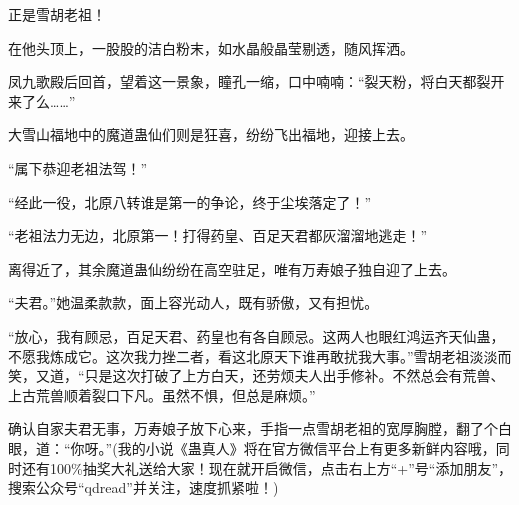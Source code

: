 \begin{this_body}
正是雪胡老祖！

在他头顶上，一股股的洁白粉末，如水晶般晶莹剔透，随风挥洒。

凤九歌殿后回首，望着这一景象，瞳孔一缩，口中喃喃：“裂天粉，将白天都裂开来了么……”

大雪山福地中的魔道蛊仙们则是狂喜，纷纷飞出福地，迎接上去。

“属下恭迎老祖法驾！”

“经此一役，北原八转谁是第一的争论，终于尘埃落定了！”

“老祖法力无边，北原第一！打得药皇、百足天君都灰溜溜地逃走！”

离得近了，其余魔道蛊仙纷纷在高空驻足，唯有万寿娘子独自迎了上去。

“夫君。”她温柔款款，面上容光动人，既有骄傲，又有担忧。

“放心，我有顾忌，百足天君、药皇也有各自顾忌。这两人也眼红鸿运齐天仙蛊，不愿我炼成它。这次我力挫二者，看这北原天下谁再敢扰我大事。”雪胡老祖淡淡而笑，又道，“只是这次打破了上方白天，还劳烦夫人出手修补。不然总会有荒兽、上古荒兽顺着裂口下凡。虽然不惧，但总是麻烦。”

确认自家夫君无事，万寿娘子放下心来，手指一点雪胡老祖的宽厚胸膛，翻了个白眼，道：“你呀。”(我的小说《蛊真人》将在官方微信平台上有更多新鲜内容哦，同时还有100\%抽奖大礼送给大家！现在就开启微信，点击右上方“+”号“添加朋友”，搜索公众号“qdread”并关注，速度抓紧啦！)

\end{this_body}

